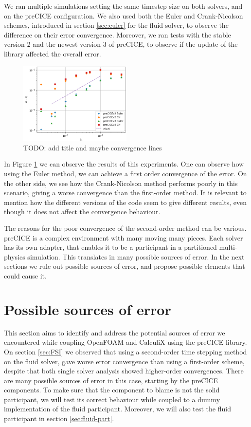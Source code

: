 \documentclass[
  english,        %
  font=times,     %
  onecolumn,      %
]{tumarticle}
\begin{document}
We ran multiple simulations setting the same timestep size on both solvers, and on the preCICE configuration. We also used both the Euler and Crank-Nicolson schemes, introduced in section \ref{sec:euler} for the fluid solver, to observe the difference on their error convergence. Moreover, we ran tests with the stable version 2 and the newest version 3 of preCICE, to observe if the update of the library affected the overall error. 
\begin{figure}[!ht]
    \centering
    \includegraphics[width=0.5\textwidth]{resources/coupled_v2_v3_results.png}
    \caption{TODO: add title and maybe convergence lines}
    \label{fig:coupled_v2_v3}
\end{figure}
In Figure \ref{fig:coupled_v2_v3} we can observe the results of this experiments. One can observe how using the Euler method, we can achieve a first order convergence of the error. On the other side, we see how the Crank-Nicolson method performs poorly in this scenario, giving a worse convergence than the first-order method. It is relevant to mention how the different versions of the code seem to give different results, even though it does not affect the convergence behaviour.  

The reasons for the poor convergence of the second-order method can be various. preCICE is a complex environment with many moving many pieces. Each solver has its own adapter, that enables it to be a participant in a partitioned multi-physics simulation. This translates in many possible sources of error. In the next sections we rule out possible sources of error, and propose possible elements that could cause it. 


\section{Possible sources of error}
This section aims to identify and address the potential sources of error we encountered while coupling OpenFOAM and CalculiX using the preCICE library. On section \ref{sec:FSI} we observed that using a second-order time stepping method on the fluid solver, gave worse error convergence than using a first-order scheme, despite that both single solver analysis showed higher-order convergences. There are many possible sources of error in this case, starting by the preCICE components. To make sure that the component to blame is not the solid participant, we will test its correct behaviour while coupled to a dummy implementation of the fluid participant. Moreover, we will also test the fluid participant in section \ref{sec:fluid-part}.
\end{document}
